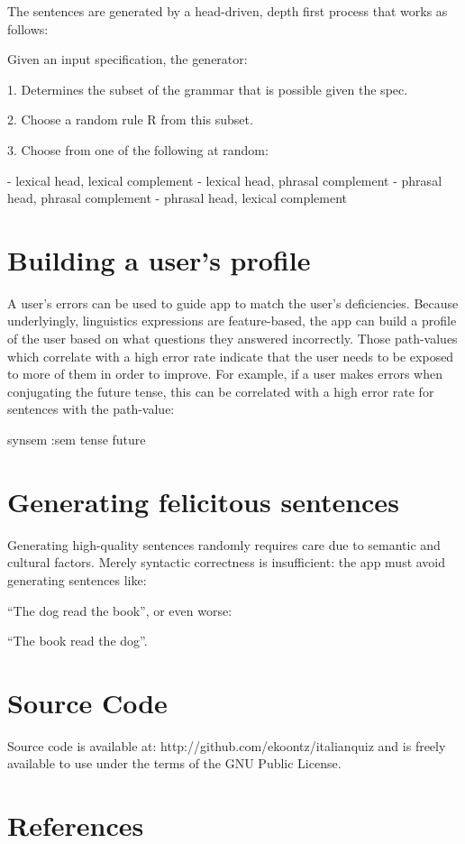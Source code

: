The sentences are generated by a head-driven, depth first process that
works as follows:

Given an input specification, the generator:

1. Determines the subset of the grammar that is possible given the
spec.

2. Choose a random rule R from this subset.

3. Choose from one of the following at random:

   - lexical head, lexical complement
   - lexical head, phrasal complement
   - phrasal head, phrasal complement
   - phrasal head, lexical complement




\section{Building a user's profile}

A user's errors can be used to guide app to match the user's
deficiencies. Because underlyingly, linguistics expressions are
feature-based, the app can build a profile of the user based on what
questions they answered incorrectly. Those path-values which
correlate with a high error rate indicate that the user needs to be
exposed to more of them in order to improve. For example, if a user
makes errors when conjugating the future tense, this can be correlated
with a high error rate for sentences with the path-value:

   {synsem {:sem {tense future}}}
 
\section{Generating felicitous sentences}

Generating high-quality sentences randomly requires care due to
semantic and cultural factors. Merely syntactic correctness is
insufficient: the app must avoid generating sentences like:

``The dog read the book'', or even worse:

``The book read the dog''. 

\section{Source Code}

Source code is available at: http://github.com/ekoontz/italianquiz and
is freely available to use under the terms of the GNU Public License.

\section{References}







